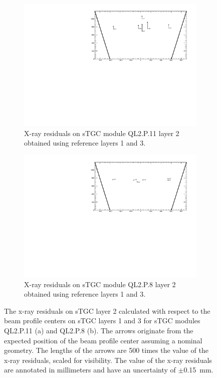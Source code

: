 \newpage
\thispagestyle{empty}
\begin{figure}
\centering
\begin{subfigure}{\textwidth}
  \centering
  \includegraphics[width=\linewidth]{figures/QL2P11_xray_residuals_layer2_fixedlayers13.pdf}
  \caption{X-ray residuals on sTGC module QL2.P.11 layer 2 obtained using reference layers 1 and 3.}
  \label{fig:xray_res_th2_ql2p11}
\end{subfigure}%
\vspace*{\floatsep}
\begin{subfigure}{\textwidth}
  \centering
  \includegraphics[width=\linewidth]{figures/QL2P08_xray_residuals_layer2_fixedlayers13.pdf}
  \caption{X-ray residuals on sTGC module QL2.P.8 layer 2 obtained using reference layers 1 and 3.}
  \label{fig:xray_res_th2_ql2p8}
\end{subfigure}
\caption{The x-ray residuals on sTGC layer 2 calculated with respect to the beam profile centers on sTGC layers 1 and 3 for sTGC modules QL2.P.11 (a) and QL2.P.8 (b). The arrows originate from the expected position of the beam profile center assuming a nominal geometry. The lengths of the arrows are 500 times the value of the x-ray residuals, scaled for visibility. The value of the x-ray residuals are annotated in millimeters and have an uncertainty of $\pm$\SI{0.15}{mm}.}
\label{fig:xray_res_th2}
\end{figure}
\newpage
\restoregeometry


